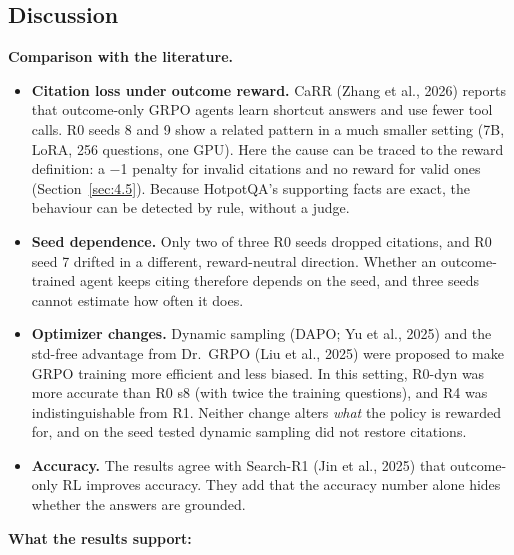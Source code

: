 \subsection{Discussion}\label{sec:4.8}

\textbf{Comparison with the literature.}

\begin{itemize}
\tightlist
\item
  \textbf{Citation loss under outcome reward.} CaRR (Zhang et al., 2026)
  reports that outcome-only GRPO agents learn shortcut answers and use
  fewer tool calls. R0 seeds 8 and 9 show a related pattern in a much
  smaller setting (7B, LoRA, 256 questions, one GPU). Here the cause can
  be traced to the reward definition: a −1 penalty for invalid citations
  and no reward for valid ones (Section~\ref{sec:4.5}). Because
  HotpotQA's supporting facts are exact, the behaviour can be detected
  by rule, without a judge.
\item
  \textbf{Seed dependence.} Only two of three R0 seeds dropped
  citations, and R0 seed 7 drifted in a different, reward-neutral
  direction. Whether an outcome-trained agent keeps citing therefore
  depends on the seed, and three seeds cannot estimate how often it
  does.
\item
  \textbf{Optimizer changes.} Dynamic sampling (DAPO; Yu et al., 2025)
  and the std-free advantage from Dr.~GRPO (Liu et al., 2025) were
  proposed to make GRPO training more efficient and less biased. In this
  setting, R0-dyn was more accurate than R0 s8 (with twice the training
  questions), and R4 was indistinguishable from R1. Neither change
  alters \emph{what} the policy is rewarded for, and on the seed tested
  dynamic sampling did not restore citations.
\item
  \textbf{Accuracy.} The results agree with Search-R1 (Jin et al., 2025)
  that outcome-only RL improves accuracy. They add that the accuracy
  number alone hides whether the answers are grounded.
\end{itemize}

\textbf{What the results support:}


